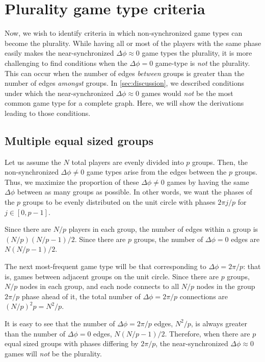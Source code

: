 \section{Plurality game type criteria}
Now, we wish to identify criteria in which
non-synchronized game types can become the plurality.
While having all or most of the players with the same phase
easily makes the near-synchronized $\Delta \phi \approx 0$
game types the plurality,
it is more challenging to find conditions
when the $\Delta \phi = 0$ game-type is \emph{not} the plurality.
This can occur when the number of edges \emph{between} groups
is greater than the number of edges \emph{amongst} groups.
In \cref{sec:discussion}, we described conditions under which
the near-synchronized $\Delta \phi \approx 0$ games would \emph{not} be
the most common game type for a complete graph.
Here, we will show the derivations leading to those conditions.

\subsection{Multiple equal sized groups}
\label{sec:multiple_equal_groups}
Let us assume the $N$ total players are evenly divided
into $p$ groups.
Then, the non-synchronized $\Delta \phi \neq 0$ game types
arise from the edges between the $p$ groups.
Thus, we maximize the proportion of these $\Delta \phi \neq 0$ games
by having the same $\Delta \phi$ between as many groups as possible.
In other words, we want the phases of the $p$ groups
to be evenly distributed on the unit circle with phases $2 \pi j/p$
for $j \in [0,p-1]$.

Since there are $N/p$ players in each group,
the number of edges within a group is $(N/p)(N/p - 1)/2$.
Since there are $p$ groups, the number of $\Delta \phi = 0$ edges are
$N (N/p - 1)/2$.

The next most-frequent game type will be that corresponding to
$\Delta \phi = 2 \pi/p$:
that is, games between adjacent groups on the unit circle.
Since there are $p$ groups,
$N/p$ nodes in each group,
and each node connects to all $N/p$ nodes in the group
$2 \pi/p$ phase ahead of it,
the total number of $\Delta \phi = 2 \pi/p$ connections
are $(N/p)^2 p = N^2/p$.

It is easy to see that the number of $\Delta \phi = 2\pi/p$ edges,
$N^2/p$,
is always greater than the number of $\Delta \phi = 0$ edges,
$N(N/p - 1)/2$.
Therefore, when there are $p$ equal sized groups
with phases differing by $2\pi/p$,
the near-synchronized $\Delta \phi \approx 0$ games will \emph{not} be the plurality.

